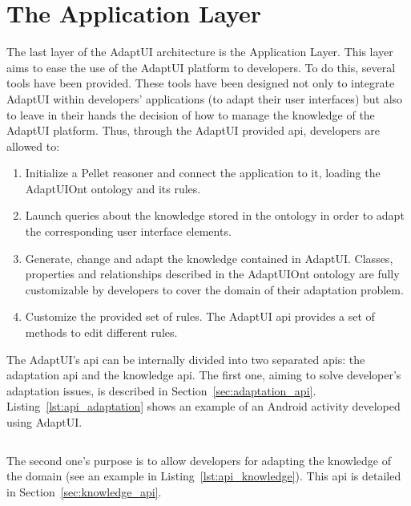 \section{The Application Layer}
\label{sec:application_layer}

The last layer of the AdaptUI architecture is the Application Layer. This layer
aims to ease the use of the AdaptUI platform to developers. To do this, several
tools have been provided. These tools have been designed not only to integrate
AdaptUI within developers' applications (to adapt their user interfaces) but also
to leave in their hands the decision of how to manage the knowledge of the AdaptUI
platform. Thus, through the AdaptUI provided \ac{api}, developers are allowed to:

\begin{enumerate}[label=\alph*)]
 \item Initialize a Pellet reasoner and connect the application to it, loading
 the AdaptUIOnt ontology and its rules.
 
 \item Launch queries about the knowledge stored in the ontology in order to
 adapt the corresponding user interface elements.
 
 \item Generate, change and adapt the knowledge contained in AdaptUI. Classes,
 properties and relationships described in the AdaptUIOnt ontology are fully
 customizable by developers to cover the domain of their adaptation problem.
 
 \item Customize the provided set of rules. The AdaptUI \ac{api} provides a set of
 methods to edit different rules.
\end{enumerate}

The AdaptUI's \ac{api} can be internally divided into two separated \acp{api}:
the adaptation \ac{api} and the knowledge \ac{api}. The first one, aiming to solve 
developer's adaptation issues, is described in Section~\ref{sec:adaptation_api}. 
Listing~\ref{lst:api_adaptation} shows an example of an Android activity 
developed using AdaptUI. 

\inputminted[linenos=true, fontsize=\footnotesize, frame=lines]{java}{4_system_architecture/api_adaptation.java}

The second one's purpose is to allow developers for adapting
the knowledge of the domain (see an example in Listing~\ref{lst:api_knowledge}).
This \ac{api} is detailed in Section~\ref{sec:knowledge_api}.

